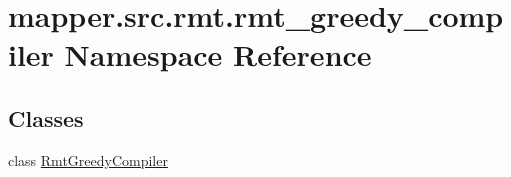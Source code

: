 \hypertarget{namespacemapper_1_1src_1_1rmt_1_1rmt__greedy__compiler}{}\section{mapper.\+src.\+rmt.\+rmt\+\_\+greedy\+\_\+compiler Namespace Reference}
\label{namespacemapper_1_1src_1_1rmt_1_1rmt__greedy__compiler}
\subsection*{Classes}
\begin{DoxyCompactItemize}
\item 
class \hyperlink{classmapper_1_1src_1_1rmt_1_1rmt__greedy__compiler_1_1_rmt_greedy_compiler}{Rmt\+Greedy\+Compiler}
\end{DoxyCompactItemize}
